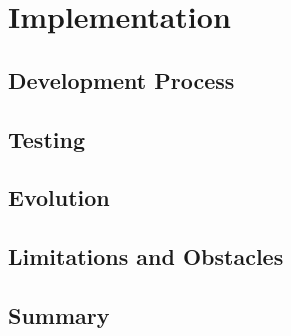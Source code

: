 \chapter{Implementation}
\section{Development Process}
\section{Testing}
\section{Evolution}
\section{Limitations and Obstacles}
\section{Summary}
